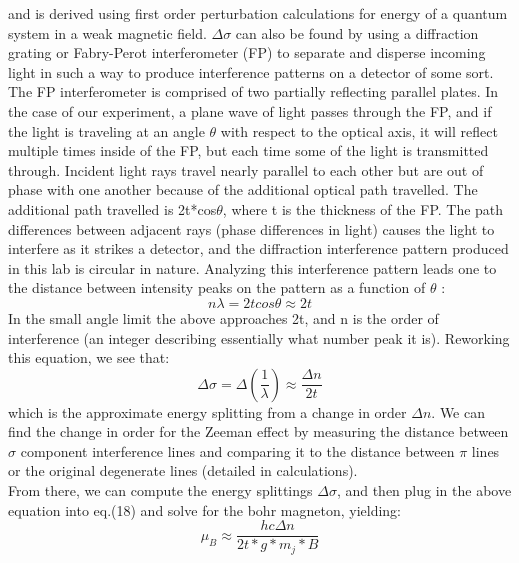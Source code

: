 \documentclass{article}
\begin{document}
    and is derived using first order perturbation calculations for energy of a quantum system in a weak magnetic field. $\Delta \sigma$ can also be found by using a diffraction grating or Fabry-Perot interferometer (FP) to separate and disperse incoming light in such a way to produce interference patterns on a detector of some sort. The FP interferometer is comprised of two partially reflecting parallel plates. In the case of our experiment, a plane wave of light passes through the FP, and if the light is traveling at an angle $\theta$ with respect to the optical axis, it will reflect multiple times inside of the FP, but each time some of the light is transmitted through. Incident light rays travel nearly parallel to each other but are out of phase with one another because of the additional optical path travelled. The additional path travelled is 2t*cos$\theta$, where t is the thickness of the FP. The path differences between adjacent rays (phase differences in light) causes the light to interfere as it strikes a detector, and the diffraction interference pattern produced in this lab is circular in nature. Analyzing this interference pattern leads one to the distance between intensity peaks on the pattern as a function of $\theta$ \cite{atm}:
    \begin{equation}
       n \lambda =  2tcos\theta \approx 2t
    \end{equation}
    In the small angle limit the above approaches 2t, and n is the order of interference (an integer describing essentially what number peak it is). Reworking this equation, we see that:
    \begin{equation}
        \Delta \sigma = \Delta (\frac{1}{\lambda}) \approx \frac{\Delta n}{2t}
    \end{equation}
    which is the approximate energy splitting from a change in order $\Delta n$. We can find the change in order for the Zeeman effect by measuring the distance between $\sigma$ component interference lines and comparing it to the distance between $\pi$ lines or the original degenerate lines (detailed in calculations). \\ From there, we can compute the energy splittings $\Delta \sigma$, and then plug in the above equation into eq.(18) and solve for the bohr magneton, yielding:
    \begin{equation}
        \mu_B \approx \frac{hc\Delta n}{2t*g*m_j*B}
    \end{equation}
\end{document}
